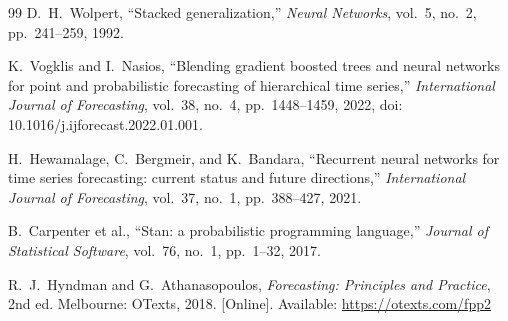 \documentclass[conference]{IEEEtran}
\begin{document}
\begin{thebibliography}{99}
     D.\ H.\ Wolpert, ``Stacked generalization,'' \textit{Neural
      Networks}, vol.\ 5, no.\ 2, pp.\ 241--259, 1992.

     K.\ Vogklis and I.\ Nasios, ``Blending
      gradient boosted trees and neural networks for point and probabilistic
      forecasting of hierarchical time series,'' \textit{International Journal
      of Forecasting}, vol.\ 38, no.\ 4, pp.\ 1448--1459, 2022, doi: 10.1016/j.ijforecast.2022.01.001.

     H.\ Hewamalage, C.\ Bergmeir, and K.\ Bandara,
      ``Recurrent neural networks for time series forecasting: current status
      and future directions,'' \textit{International Journal of Forecasting}, vol.\ 37,
      no.\ 1, pp.\ 388--427, 2021.

     B.\ Carpenter et al., ``Stan: a probabilistic programming language,''
      \textit{Journal of Statistical Software}, vol.\ 76, no.\ 1, pp.\ 1--32, 2017.

     R.\ J.\ Hyndman and G.\ Athanasopoulos, \textit{Forecasting:
      Principles and Practice}, 2nd ed. Melbourne: OTexts, 2018. [Online]. Available:
      \url{https://otexts.com/fpp2}
  \end{thebibliography}
\end{document}
